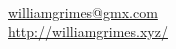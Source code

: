\documentclass[margin,line]{resume}
\begin{document}
{
    \hfill                                                           \ \Mobilefone     \vspace{0mm}\\\vspace{0mm}%
    \hfill \href{mailto:williamgrimes@gmx.com}{williamgrimes@gmx.com} \ \Letter        \vspace{0mm}\\\vspace{0mm}%
    \hfill \url{http://williamgrimes.xyz/} \                            \ComputerMouse \vspace{0mm}\\\vspace{-10mm}%
}
\end{document}
